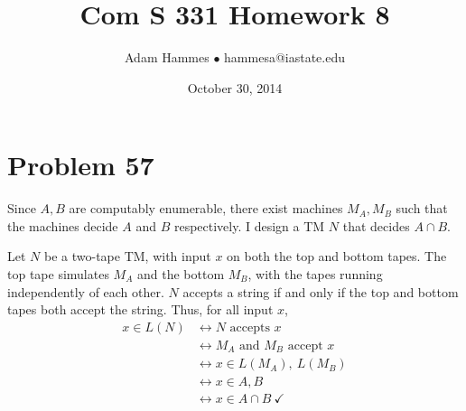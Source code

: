 \documentclass[11pt]{article}
\let\iff\leftrightarrow
\begin{document}
\title{Com S 331 Homework 8}
\author{Adam Hammes $\bullet$ hammesa@iastate.edu}
\date{October 30, 2014}
\maketitle

\section*{Problem 57}

Since $A, B$ are computably enumerable, there exist machines $M_A, M_B$ such that the machines decide $A$ and $B$ respectively.
I design a TM $N$ that decides $A \cap B$.

Let $N$ be a two-tape TM, with input $x$ on both the top and bottom tapes. 
The top tape simulates $M_A$ and the bottom $M_B$, with the tapes running independently of each other.
$N$ accepts a string if and only if the top and bottom tapes both accept the string. Thus, for all input $x$,
\begin{align*}
	x \in L(N) &\iff N \text{ accepts } x \\
	&\iff M_A \text{ and } M_B \text{ accept } x \\
	&\iff x \in L(M_A),\ L(M_B) \\
	&\iff x \in A, B \\
	&\iff x \in A \cap B \ \checkmark
\end{align*}
\end{document}
